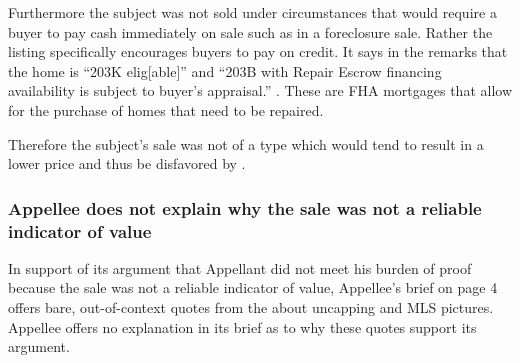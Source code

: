\documentclass[12pt,\documentclassflag]{michiganCourtOfAppealsBrief}
\begin{document}
 Furthermore the subject was not sold under circumstances that would require a buyer to pay cash immediately on sale such as in a foreclosure sale.
 Rather the listing specifically encourages buyers to pay on credit. It says in the remarks that the home is ``203K elig[able]'' and ``203B with Repair Escrow financing availability is subject to buyer's appraisal.'' \mlsListing. These are FHA mortgages that allow for the purchase of homes that need to be repaired.

 Therefore the subject's sale was not of a type which would tend to result in a lower price and thus be disfavored by \cite[s]{MCL 211.27(1)}.

\subsubsection{Appellee does not explain why the sale was not a reliable indicator of value}

In support of its argument that Appellant did not meet his burden of proof because the sale was not a reliable indicator of value, Appellee's brief on page 4 offers bare, out-of-context quotes from the \foj[5] about uncapping and MLS pictures. Appellee offers no explanation in its brief as to why these quotes support its argument.


\end{document}
